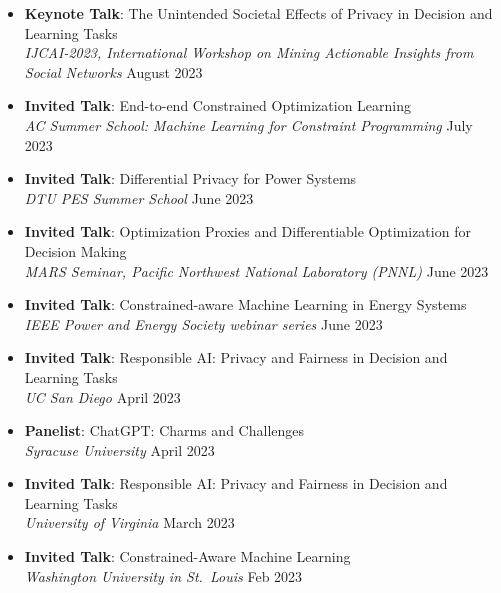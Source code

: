 

\begin{itemize}
  \item {\bf Keynote Talk}: {The Unintended Societal Effects of Privacy in Decision and Learning Tasks}\\
  {\em  IJCAI-2023, International Workshop on Mining Actionable Insights from Social Networks}
  \hfill{August 2023}

  \item {\bf Invited Talk}: {End-to-end Constrained Optimization Learning}\\
  {\em  AC Summer School: Machine Learning for Constraint Programming}
  \hfill{July 2023}

  \item {\bf Invited Talk}: {Differential Privacy for Power Systems}\\
  {\em  DTU PES Summer School}
  \hfill{June 2023}

  \item {\bf Invited Talk}: {Optimization Proxies and Differentiable Optimization for Decision Making}\\
  {\em  MARS Seminar, Pacific Northwest National Laboratory (PNNL)}
  \hfill{June 2023}

  \item {\bf Invited Talk}: {Constrained-aware Machine Learning in Energy Systems}\\
  {\em  IEEE Power and Energy Society webinar series}
  \hfill{June 2023}

  \item {\bf Invited Talk}: {Responsible AI: Privacy and Fairness in Decision and Learning Tasks}\\
  {\em  UC San Diego}
  \hfill{April 2023}

  \item {\bf Panelist}: {ChatGPT: Charms and Challenges}\\
  {\em  Syracuse University}
  \hfill{April 2023}

  \item {\bf Invited Talk}: {Responsible AI: Privacy and Fairness in Decision and Learning Tasks}\\
  {\em  University of Virginia}
  \hfill{March 2023}

  \item {\bf Invited Talk}: {Constrained-Aware Machine Learning}\\
  {\em  Washington University in St.~Louis}
  \hfill{Feb 2023}


\end{itemize}
